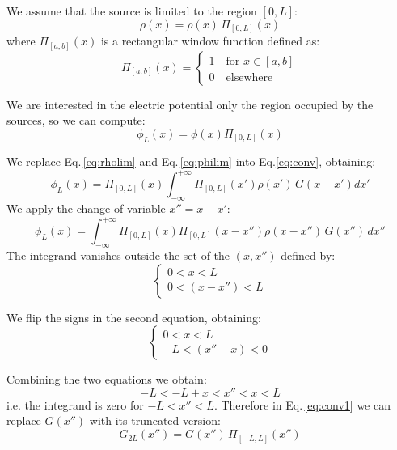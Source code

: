 We assume that the source is limited to the region  $[0, L]$:
\begin{equation}
\rho(x) = \rho(x)\,\Pi_{[0,L]}\left(x\right)
\label{eq:rholim}
\end{equation}
where $\Pi_{[a,b]}(x)$ is a rectangular window function defined as:
\begin{equation}
\Pi_{[a,b]}(x) = 
\begin{cases}
1\quad\text{for } x \in [a, b]\\
0\quad\text{elsewhere}
\end{cases}
\end{equation}

We are interested in the electric potential only the region occupied by the sources, so we can compute:
\begin{equation}
\phi_L(x) = \phi(x) \Pi_{[0, L]}\left(x\right)
\label{eq:philim}
\end{equation}

We replace Eq.\,\eqref{eq:rholim} and Eq.\,\eqref{eq:philim} into Eq.\eqref{eq:conv}, obtaining:
\begin{equation}
\phi_L(x) = \Pi_{[0,L]}\left( x\right)
\int_{-\infty}^{+\infty} 
\Pi_{[0,L]}\left(x'\right)
\rho(x')\,G(x-x') dx'
\end{equation}
We apply the change of variable $x'' = x - x'$:
\begin{equation}
\phi_L(x) = 
\int_{-\infty}^{+\infty} 
\Pi_{[0,L]}\left({x}\right)
\Pi_{[0,L]}\left({x-x''}\right)
\rho(x-x'')\,G(x'') \,dx''
\label{eq:conv1}
\end{equation}
The integrand vanishes outside the set of the $(x, x'')$ defined by:
\begin{equation}
\begin{cases}
0 < x <{L}\\
0 < (x-x'') <{L}
\end{cases}
\end{equation}

We flip the signs in the second equation, obtaining:
\begin{equation}
\begin{cases}
0 < x <{L}\\
-L < (x''-x) <0
\end{cases}
\end{equation}

Combining the two equations we obtain:
\begin{equation}
-L<-L + x < x'' <x<L
\end{equation}
i.e. the integrand is zero for $-L<x''<L$.
Therefore in Eq.\,\eqref{eq:conv1} we can replace $G(x'')$ with its truncated version:
\begin{equation}
G_{2L}(x'') = G(x'')\,\Pi_{[-L,L]}
\left(
{x''}
\right)
\end{equation}

